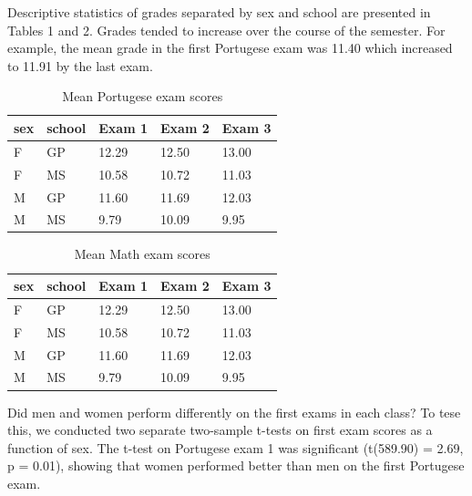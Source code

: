\documentclass[english,floatsintext,man]{apa6}
\theoremstyle{definition}
\theoremstyle{definition}
\theoremstyle{definition}
\theoremstyle{remark}
\begin{document}
Descriptive statistics of grades separated by sex and school are
presented in Tables 1 and 2. Grades tended to increase over the course
of the semester. For example, the mean grade in the first Portugese exam
was 11.40 which increased to 11.91 by the last exam.

\begin{table}[tbp]
\begin{center}
\begin{threeparttable}
\caption{\label{tab:tbl1}Mean Portugese exam scores}
\begin{tabular}{lllll}
\toprule
sex & \multicolumn{1}{c}{school} & \multicolumn{1}{c}{Exam 1} & \multicolumn{1}{c}{Exam 2} & \multicolumn{1}{c}{Exam 3}\\
\midrule
F & GP & 12.29 & 12.50 & 13.00\\
F & MS & 10.58 & 10.72 & 11.03\\
M & GP & 11.60 & 11.69 & 12.03\\
M & MS & 9.79 & 10.09 & 9.95\\
\bottomrule
\end{tabular}
\end{threeparttable}
\end{center}
\end{table}

\begin{table}[tbp]
\begin{center}
\begin{threeparttable}
\caption{\label{tab:tbl2}Mean Math exam scores}
\begin{tabular}{lllll}
\toprule
sex & \multicolumn{1}{c}{school} & \multicolumn{1}{c}{Exam 1} & \multicolumn{1}{c}{Exam 2} & \multicolumn{1}{c}{Exam 3}\\
\midrule
F & GP & 12.29 & 12.50 & 13.00\\
F & MS & 10.58 & 10.72 & 11.03\\
M & GP & 11.60 & 11.69 & 12.03\\
M & MS & 9.79 & 10.09 & 9.95\\
\bottomrule
\end{tabular}
\end{threeparttable}
\end{center}
\end{table}

Did men and women perform differently on the first exams in each class?
To tese this, we conducted two separate two-sample t-tests on first exam
scores as a function of sex. The t-test on Portugese exam 1 was
significant (t(589.90) = 2.69, p = 0.01), showing that women performed
better than men on the first Portugese exam.
\end{document}
